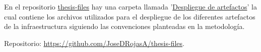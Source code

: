 \newpage
{}\label{appendix:Archivos de despliegue}

En el repositorio \href{https://github.com/JoseDRojasA/thesis-files}{thesis-files} hay una carpeta llamada '\href{https://github.com/JoseDRojasA/thesis-files/tree/master/Despliegue de artefactos}{Despliegue de artefactos}' la cual contiene los archivos utilizados para el despliegue de los diferentes artefactos de la infraestructura siguiendo las convenciones planteadas en la metodolog\'ia.

\noindent Repositorio: \url{https://github.com/JoseDRojasA/thesis-files}.